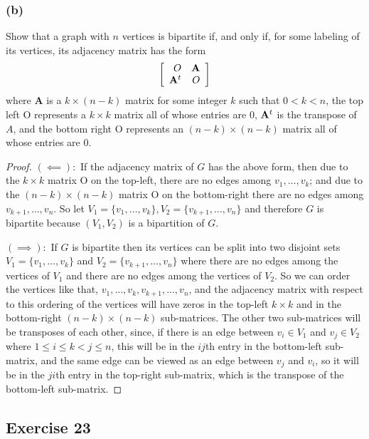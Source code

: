 \documentclass[14pt]{extarticle}
\begin{document}
\subsubsection{(b)}
Show that a graph with \(n\) vertices is bipartite if, and only if, for some labeling of its vertices, its adjacency 
matrix has the form
\[
\left[ 
\begin{array}{rr}
O & {\bf A} \\
{\bf A}^t & O \\
\end{array}
\right]
\]
where {\bf A} is a \(k \times (n - k)\) matrix for some integer \(k\) such that \(0 < k < n\), the top left O 
represents a \(k \times k\) matrix all of whose entries are 0, \({\bf A}^t\) is the transpose of \(A\), and the bottom right 
O represents an \((n - k) \times (n - k)\) matrix all of whose entries are 0.

\begin{proof}
\(\bm{(\impliedby):}\) If the adjacency matrix of \(G\) has the above form, then due to the \(k \times k\) matrix O on the
top-left, there are no edges among \(v_1, \ldots, v_k\); and due to the \((n-k) \times (n-k)\) matrix O on the bottom-right 
there are no edges among \(v_{k+1}, \ldots, v_n\). So let \(V_1 = \{v_1, \ldots, v_k\}, V_2 = \{v_{k+1}, \ldots, v_n\}\)
and therefore \(G\) is bipartite because \((V_1, V_2)\) is a bipartition of \(G\).

\(\bm{(\implies):}\) If \(G\) is bipartite then its vertices can be split into two disjoint sets \(V_1 = \{v_1, \ldots, 
v_k\}\) and \(V_2 = \{v_{k+1}, \ldots, v_n\}\) where there are no edges among the vertices of \(V_1\) and there are no edges
among the vertices of \(V_2\). So we can order the vertices like that, \(v_1, \ldots, v_k, v_{k+1}, \ldots, v_n\), and
the adjacency matrix with respect to this ordering of the vertices will have zeros in the top-left \(k \times k\) and in 
the bottom-right \((n-k) \times (n-k)\) sub-matrices. The other two sub-matrices will be transposes of each other, 
since, if there is an edge between \(v_i \in V_1\) and \(v_j \in V_2\) where \(1 \leq i \leq k < j \leq n\), this will be 
in the \(ij\)th entry in the bottom-left sub-matrix, and the same edge can be viewed as an edge between \(v_j\) and 
\(v_i\), so it will be in the \(ji\)th entry in the top-right
sub-matrix, which is the transpose of the bottom-left sub-matrix.
\end{proof}

\subsection{Exercise 23}
\end{document}
